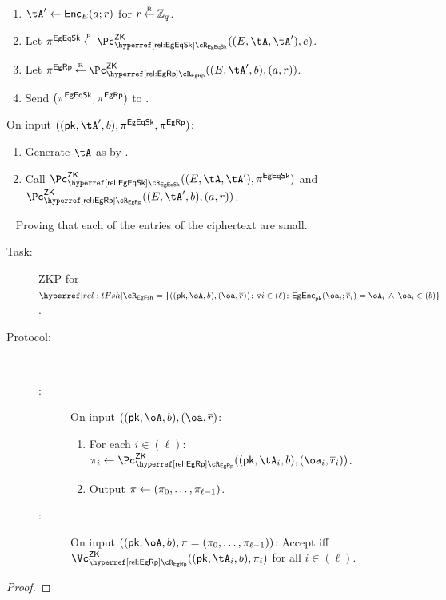 \begin{description}
\begin{description}
\begin{description}
\begin{enumerate}
		
			
			\item   $\tA' \asn \Enc_E(a;r)$ for $r\mathbin{\stackrel{\mbox{\tiny R}}{\leftarrow}} {\mathbb Z}_q$.
			
				
			
			\item  Let  $\pi^\EgEqSkS \getsr \pZK{\rEgEqSk}((E,\tA,\tA'
			), e)$.
				
			\item  Let  $\pi^\EgRps \getsr \pZK{\rEgRp}((E,\tA',b), (a,r))$.
			
			\item Send $(\pi^{{\sf EgEqSk}},\pi^{{\sf EgRp}})$ to \Vc.
		\end{enumerate}
		
		
		\item[\Vc:] On input $((\pk,\tA',b),\pi^\EgEqSkS,\pi^\EgRps)$:
		
		\begin{enumerate}
			\item   Generate $\tA$ as by \Pc.
			\item  Call $\pZK{\rEgEqSk}((E,\tA,\tA'
			), \pi^\EgEqSkS)$ and  $\pZK{\rEgRp}((E,\tA',b), (a,r))$.
			
		\end{enumerate}
		
	\end{description}

	
\end{description}
	
\item[Freshness.]  ~
Proving that each of the entries of the  ciphertext are small. 

\begin{description}
	\item[Task:] ZKP for $\rtFsh =\rtFshDef$.

\item[Protocol:]~

\begin{description}	
	\item[\Pc:] On  input  $((\pk,\oA,b),(\oa,\orr)$:
	
	\begin{enumerate}
		\item For each $i\in (\ell)$: $\pi_i \asn \pZK{\rEgRp}((\pk,\tA_i,b), (\oa_i,\orr_i))$.
		\item Output $\pi \leftarrow (\pi_0,\ldots, \pi_{\ell-1})$.
	\end{enumerate}
	 
	 
	 	\item[\Vc:] On  input  $((\pk,\oA,b), \pi= (\pi_0,\ldots, \pi_{\ell-1}))$: Accept iff  $\vZK{\rEgRp}((\pk,\tA_i,b), \pi_i)$ for all $i\in (\ell)$.
	 
	 
\end{description}

\end{description}

\begin{proof}
\end{proof}
\end{description}


